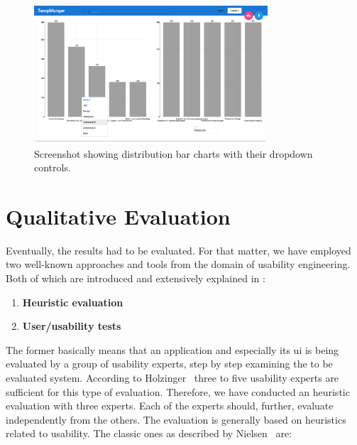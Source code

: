 \begin{figure}[h]
  \centering
  \includegraphics[width=0.777\textwidth]{figures/implementation/screenshot-bar-charts}
  \caption{Screenshot showing distribution bar charts with their dropdown controls.}
  \label{fig:screenshot-bar-charts}
\end{figure}


\section{Qualitative Evaluation} \label{sec:qualitative-evaluation}

Eventually, the results had to be evaluated.
For that matter, we have employed two well-known approaches and tools from the domain of usability engineering.
Both of which are introduced and extensively explained in \cite{Nielsen1993}:

\begin{enumerate}
  \item \textbf{Heuristic evaluation}
  \item \textbf{User/usability tests}
\end{enumerate}

The former basically means that an application and especially its \gls{ui} is being evaluated by a group of usability experts, step by step examining the to be evaluated system.
According to Holzinger~\cite{Holzinger2005} three to five usability experts are sufficient for this type of evaluation.
Therefore, we have conducted an heuristic evaluation with three experts.
Each of the experts should, further, evaluate independently from the others.
The evaluation is generally based on heuristics related to usability.
The classic ones as described by Nielsen~\cite{Nielsen1993} are:

